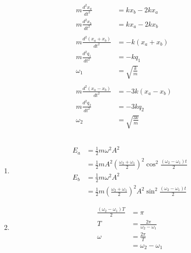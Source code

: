 \documentclass{article}
\begin{document}
\subsection{}

\begin{align*}
  m \frac{d^2 x_a}{d t^2}         & = k x_b - 2 k x_a      \\
  m \frac{d^2 x_b}{d t^2}         & = k x_a - 2 k x_b      \\ \\
  m \frac{d^2 (x_a + x_b)}{d t^2} & = -k (x_a + x_b)       \\
  m \frac{d^2 q_1}{d t^2}         & = -k q_1               \\
  \omega_1                        & = \sqrt{\frac{k}{m}}   \\ \\
  m \frac{d^2 (x_a - x_b)}{d t^2} & = -3 k (x_a - x_b)     \\
  m \frac{d^2 q_2}{d t^2}         & = -3 k q_2             \\
  \omega_2                        & = \sqrt{\frac{3 k}{m}}
\end{align*}

\subsection{}

\begin{enumerate}
  \item

        \begin{align*}
          E_a & = \frac{1}{2} m \omega^2 A^2                                                                                \\
              & = \frac{1}{2} m A^2 \left( \frac{\omega_2 + \omega_1}{2} \right)^2 \cos^2 \frac{(\omega_2 - \omega_1) t}{2} \\
          E_b & = \frac{1}{2} m \omega^2 A^2                                                                                \\
              & = \frac{1}{2} m \left( \frac{\omega_2 + \omega_1}{2} \right)^2 A^2 \sin^2 \frac{(\omega_2 - \omega_1) t}{2}
        \end{align*}

  \item

        \begin{align*}
          \frac{(\omega_2 - \omega_1) T}{2} & = \pi                               \\
          T                                 & = \frac{2 \pi}{\omega_2 - \omega_1} \\
          \omega                            & = \frac{2 \pi}{T}                   \\
                                            & = \omega_2 - \omega_1
        \end{align*}
\end{enumerate}
\end{document}

